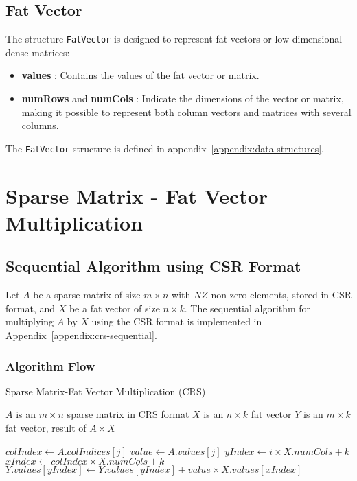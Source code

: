 \documentclass[12pt,oneside]{book} %
\begin{document}
\subsection{Fat Vector}
The structure \texttt{FatVector} is designed to represent fat vectors or
low-dimensional dense matrices:

\begin{itemize}
    \item \textbf{values} : Contains the values of the fat vector or matrix.
    \item \textbf{numRows} and \textbf{numCols} : Indicate the dimensions of the vector or matrix, making it possible to represent both column vectors and matrices with several columns.
\end{itemize}

The \texttt{FatVector} structure is defined in
appendix~\ref{appendix:data-structures}.

\newpage
\section{Sparse Matrix - Fat Vector Multiplication}

\subsection{Sequential Algorithm using CSR Format}

Let \( A \) be a sparse matrix of size \( m \times n \) with \( NZ \) non-zero
elements, stored in CSR format, and \( X \) be a fat vector of size \( n \times
k \). The sequential algorithm for multiplying \( A \) by \( X \) using the CSR
format is implemented in Appendix~\ref{appendix:crs-sequential}.

\subsubsection{Algorithm Flow}

\begin{algorithm}[H]
    \caption{Sparse Matrix-Fat Vector Multiplication (CRS)}
    \begin{algorithmic}
        \Require $A$ is an $m \times n$ sparse matrix in CRS format
        \Require $X$ is an $n \times k$ fat vector
        \Ensure  $Y$ is an $m \times k$ fat vector, result of $A \times X$

        \State $colIndex \gets A.colIndices[j]$
        \State $value \gets A.values[j]$
        \State $yIndex \gets i \times X.numCols + k$
        \State $xIndex \gets colIndex \times X.numCols + k$
        \State $Y.values[yIndex] \gets Y.values[yIndex] + value \times X.values[xIndex]$
        \EndFor
        \EndFor
        \EndFor
    \end{algorithmic}
\end{algorithm}
\end{document}
